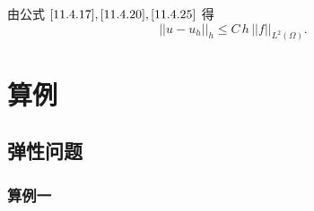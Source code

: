 \documentclass[a4paper,UTF8,titlepage,10pt]{ctexart}
\numberwithin{equation}{subsection}
\begin{document}
由公式 $\eqref{11.4.17}, \eqref{11.4.20}, \eqref{11.4.25}$ 得
\begin{equation}
	||u-u_h||_h \le C \, h \, ||f||_{L^2(\Omega)}.
\end{equation}

\clearpage

\section{算例}

\subsection{弹性问题}

\subsubsection{算例一}
\end{document}
